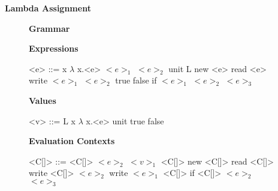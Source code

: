 \documentclass[11pt,oneside]{book}
\begin{document}
\frontmatter

\mainmatter

\pagebreak

\begin{center}
    {
        \bf
        \huge
        Lambda Assignment
    }
\end{center}

\begin{figure}[!hp]
\begin{center}
{
    \bf
    \huge
    Grammar
}
\end{center}


\setlength{\grammarindent}{10em} %

\setlength{\grammarparsep}{5pt} %

\textbf{Expressions}

\begin{grammar}

    <e> ::=  x
        \alt $\lambda$ x.<e>
        \alt $<e>_1$ $<e>_2$
        \alt unit
        \alt L
        \alt new <e>
        \alt read <e>
        \alt write $<e>_1$ $<e>_2$
        \alt true
        \alt false
        \alt if $<e>_1$ $<e>_2$ $<e>_3$

\end{grammar}

\textbf{Values}

\begin{grammar}

    <v> ::=  L
        \alt x
        \alt $\lambda$ x.<e>
        \alt unit
        \alt true
        \alt false

\end{grammar}

\textbf{Evaluation Contexts}

\begin{grammar}

    <C[\textbullet]> ::=  \textbullet
                     \alt <C[\textbullet]> $<e>_2$
                     \alt $<v>_1$ <C[\textbullet]>
                     \alt new <C[\textbullet]>
                     \alt read <C[\textbullet]>
                     \alt write <C[\textbullet]> $<e>_2$
                     \alt write $<e>_1$ <C[\textbullet]>
                     \alt if <C[\textbullet]> $<e>_2$ $<e>_3$

\end{grammar}

\end{figure}
\end{document}
